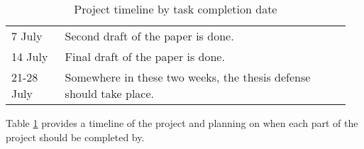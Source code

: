 \begin{table}[ht]
\begin{tabular}{@{}p{0.15\linewidth}p{0.8\linewidth}@{}}
		7 July      & Second draft of the paper is done.                                                                                                                                                                                     \\
		14 July     & Final draft of the paper is done.                                                                                                                                                                                      \\
		21-28 July  & Somewhere in these two weeks, the thesis defense should take place.                                                                                                                                                       \\ \bottomrule
	\end{tabular}
	\caption{Project timeline by task completion date}
	\label{tab:project-timeline}
\end{table}

Table \ref{tab:project-timeline} provides a timeline of the project and planning on when each part of the project should be completed by.
